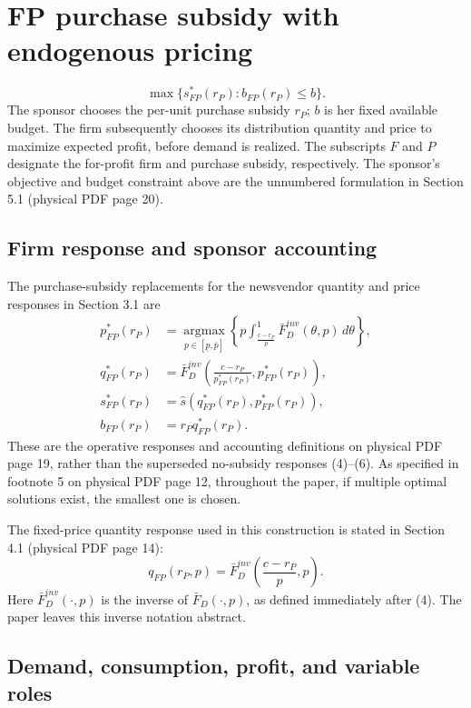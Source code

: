 \documentclass{article}
\begin{document}
\section*{FP purchase subsidy with endogenous pricing}

\[
\boxed{\max\bigl\{s_{FP}^{*}(r_P):b_{FP}(r_P)\leq b\bigr\}.}
\]
The sponsor chooses the per-unit purchase subsidy $r_P$; $b$ is her fixed available budget. The firm subsequently chooses its distribution quantity and price to maximize expected profit, before demand is realized. The subscripts $F$ and $P$ designate the for-profit firm and purchase subsidy, respectively. The sponsor's objective and budget constraint above are the unnumbered formulation in Section 5.1 (physical PDF page 20).

\subsection*{Firm response and sponsor accounting}

The purchase-subsidy replacements for the newsvendor quantity and price responses in Section 3.1 are
\begin{align*}
p_{FP}^{*}(r_P)
&=\operatorname*{argmax}_{p\in[\underline p,\bar p]}
\left\{p\int_{\frac{c-r_P}{p}}^{1}
\bar F_D^{inv}(\theta,p)\,d\theta\right\},\\
q_{FP}^{*}(r_P)
&=\bar F_D^{inv}\!\left(
\frac{c-r_P}{p_{FP}^{*}(r_P)},p_{FP}^{*}(r_P)
\right),\\
s_{FP}^{*}(r_P)
&=\hat s\!\left(q_{FP}^{*}(r_P),p_{FP}^{*}(r_P)\right),\\
b_{FP}(r_P)&=r_Pq_{FP}^{*}(r_P).
\end{align*}
These are the operative responses and accounting definitions on physical PDF page 19, rather than the superseded no-subsidy responses (4)--(6). As specified in footnote 5 on physical PDF page 12, throughout the paper, if multiple optimal solutions exist, the smallest one is chosen.

The fixed-price quantity response used in this construction is stated in Section 4.1 (physical PDF page 14):
\[
q_{FP}(r_P,p)=\bar F_D^{inv}\!\left(\frac{c-r_P}{p},p\right).
\]
Here $\bar F_D^{inv}(\cdot,p)$ is the inverse of $\bar F_D(\cdot,p)$, as defined immediately after (4). The paper leaves this inverse notation abstract.

\subsection*{Demand, consumption, profit, and variable roles}
\end{document}
